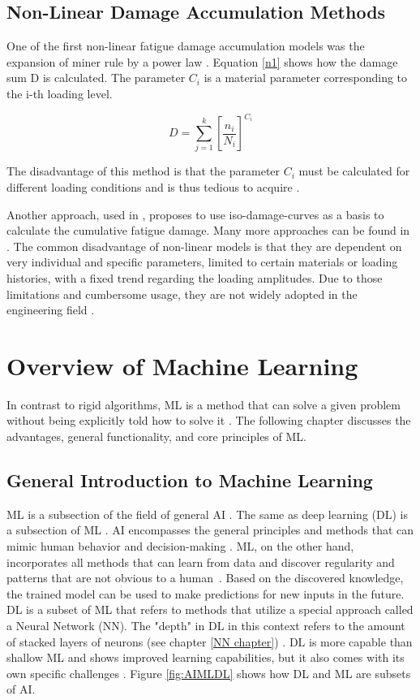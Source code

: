 \subsection{Non-Linear Damage Accumulation Methods}
One of the first non-linear fatigue damage accumulation models was the expansion of miner rule by a power law \cite{Zuo}.
Equation \ref{n1} shows how the damage sum D is calculated. The parameter \(C_i\) is a material parameter corresponding to the i-th loading level. 

\begin{equation}\label{n1}
	D = \sum_{j=1}^{k}\left [\frac{n_i}{N_i}\right ]^{{C_i}}
\end{equation}

The disadvantage of this method is that the parameter \(C_i\) must be calculated for different loading
conditions and is thus tedious to acquire \cite{Zuo}.

Another approach, used in \cite{Rege}, proposes to use iso-damage-curves as a basis to calculate the cumulative fatigue damage.\newline
Many more approaches can be found in \cite{Zhu1,Gao,Lv,Chen}. The common disadvantage of non-linear models is that they are dependent on very individual and specific parameters, limited to certain materials or loading histories, with a fixed trend regarding the loading amplitudes. Due to those limitations and cumbersome usage, they are not widely adopted in the engineering field \cite{Vietze}. 


\section{Overview of Machine Learning}
In contrast to rigid algorithms, ML is a method that can solve a given problem without being explicitly told how to solve it \cite{Sutton,Janiesch}. The following chapter discusses the advantages, general functionality, and core principles of ML.

\subsection{General Introduction to Machine Learning}\label{General Introduction to Machine Learning}
ML is a subsection of the field of general AI \cite{Helm}. The same as deep learning (DL) is a subsection of ML \cite{LeCun}.
AI encompasses the general principles and methods that can mimic human behavior and decision-making \cite{Janiesch}. ML, on the other hand, incorporates all methods that can learn from data and discover regularity and patterns that are not obvious to a human~\cite{Theodoridis}. Based on the discovered knowledge, the trained model can be used to make predictions for new inputs in the future.
DL is a subset of ML that refers to methods that utilize a special approach called a Neural Network (NN). The "depth" in DL in this context refers to the amount of stacked layers of neurons (see chapter \ref{NN chapter}) \cite{Carleo}. 
DL is more capable than shallow ML and shows improved learning capabilities, but it also comes with its own specific challenges \cite{Janiesch, LeCun}. Figure \ref{fig:AIMLDL} shows how DL and ML are subsets of AI. 

